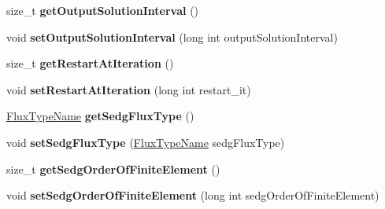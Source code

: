 \begin{DoxyCompactItemize}
\item 
\hypertarget{classnatrium_1_1SolverConfiguration_aa7fdb1358469be8faf1cc14c64538927}{
size\_\-t {\bfseries getOutputSolutionInterval} ()}
\label{classnatrium_1_1SolverConfiguration_aa7fdb1358469be8faf1cc14c64538927}

\item 
\hypertarget{classnatrium_1_1SolverConfiguration_ab49c72f19d58f7408eb14ac7fd865b78}{
void {\bfseries setOutputSolutionInterval} (long int outputSolutionInterval)}
\label{classnatrium_1_1SolverConfiguration_ab49c72f19d58f7408eb14ac7fd865b78}

\item 
\hypertarget{classnatrium_1_1SolverConfiguration_af6ac0030408e960aa8c85cd3be2c7cce}{
size\_\-t {\bfseries getRestartAtIteration} ()}
\label{classnatrium_1_1SolverConfiguration_af6ac0030408e960aa8c85cd3be2c7cce}

\item 
\hypertarget{classnatrium_1_1SolverConfiguration_a478f757724a100f13cae07adb0b04be5}{
void {\bfseries setRestartAtIteration} (long int restart\_\-it)}
\label{classnatrium_1_1SolverConfiguration_a478f757724a100f13cae07adb0b04be5}

\item 
\hypertarget{classnatrium_1_1SolverConfiguration_aecc2a87bc6e50d6e09ea035678478c4f}{
\hyperlink{namespacenatrium_a9366e68e932696b3dc277fc010ac1057}{FluxTypeName} {\bfseries getSedgFluxType} ()}
\label{classnatrium_1_1SolverConfiguration_aecc2a87bc6e50d6e09ea035678478c4f}

\item 
\hypertarget{classnatrium_1_1SolverConfiguration_a331256f91794e32be618b1162c321bdd}{
void {\bfseries setSedgFluxType} (\hyperlink{namespacenatrium_a9366e68e932696b3dc277fc010ac1057}{FluxTypeName} sedgFluxType)}
\label{classnatrium_1_1SolverConfiguration_a331256f91794e32be618b1162c321bdd}

\item 
\hypertarget{classnatrium_1_1SolverConfiguration_a1fad5bbbc062b1aad018da73e90033b2}{
size\_\-t {\bfseries getSedgOrderOfFiniteElement} ()}
\label{classnatrium_1_1SolverConfiguration_a1fad5bbbc062b1aad018da73e90033b2}

\item 
\hypertarget{classnatrium_1_1SolverConfiguration_a2a9ab8b6b6dcb47ad4bb85ef06e15dea}{
void {\bfseries setSedgOrderOfFiniteElement} (long int sedgOrderOfFiniteElement)}
\label{classnatrium_1_1SolverConfiguration_a2a9ab8b6b6dcb47ad4bb85ef06e15dea}


\end{DoxyCompactItemize}
